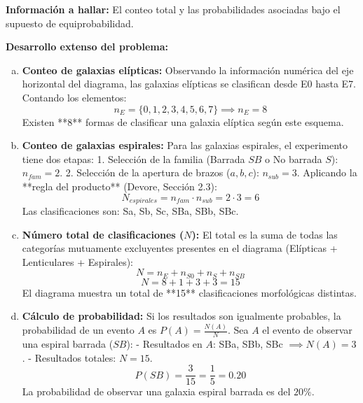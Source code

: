 \documentclass[a4paper]{article}
\begin{document}
\textbf{Información a hallar:}
El conteo total y las probabilidades asociadas bajo el supuesto de equiprobabilidad.

\textbf{Desarrollo extenso del problema:}

\begin{enumerate}[a.]
    \item \textbf{Conteo de galaxias elípticas:} 
    Observando la información numérica del eje horizontal del diagrama, las galaxias elípticas se clasifican desde E0 hasta E7. Contando los elementos:
    $$ n_E = \{0, 1, 2, 3, 4, 5, 6, 7\} \implies n_E = 8 $$
    Existen **8** formas de clasificar una galaxia elíptica según este esquema.

    \item \textbf{Conteo de galaxias espirales:}
    Para las galaxias espirales, el experimento tiene dos etapas: 
    1. Selección de la familia (Barrada $SB$ o No barrada $S$): $n_{fam} = 2$.
    2. Selección de la apertura de brazos ($a, b, c$): $n_{sub} = 3$.
    Aplicando la **regla del producto** (Devore, Sección 2.3):
    $$ N_{espirales} = n_{fam} \cdot n_{sub} = 2 \cdot 3 = 6 $$
    Las clasificaciones son: Sa, Sb, Sc, SBa, SBb, SBc.

    \item \textbf{Número total de clasificaciones ($N$):}
    El total es la suma de todas las categorías mutuamente excluyentes presentes en el diagrama (Elípticas + Lenticulares + Espirales):
    $$ N = n_E + n_{S0} + n_S + n_{SB} $$
    $$ N = 8 + 1 + 3 + 3 = 15 $$
    El diagrama muestra un total de **15** clasificaciones morfológicas distintas.

    \item \textbf{Cálculo de probabilidad:}
    Si los resultados son igualmente probables, la probabilidad de un evento $A$ es $P(A) = \frac{N(A)}{N}$. Sea $A$ el evento de observar una espiral barrada ($SB$):
    - Resultados en $A$: {SBa, SBb, SBc} $\implies N(A) = 3$.
    - Resultados totales: $N = 15$.
    $$ P(SB) = \frac{3}{15} = \frac{1}{5} = 0.20 $$
    La probabilidad de observar una galaxia espiral barrada es del $20\%$.
\end{enumerate}
\end{document}
